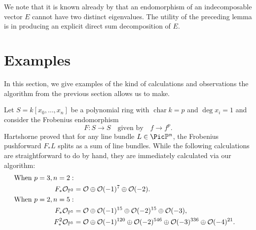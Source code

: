\documentclass[12pt]{article}
\def\O{\mathcal O}
\numberwithin{equation}{section}
\theoremstyle{theorem}
\numberwithin{thm}{section}
\theoremstyle{definition}
\begin{document}
\begin{rem}
We note that it is known already by \cite[Proposition~15]{Atiyah57} that an endomorphism of an indecomposable vector $E$ cannot have two distinct eigenvalues. The utility of the preceding lemma is in producing an explicit direct sum decomposition of $E$.
\end{rem}



\section{Examples}

In this section, we give examples of the kind of calculations and observations the algorithm from the previous section allows us to make.

\renewcommand{\char}{\operatorname{char}}

\begin{exa}
  Let $S = k[x_0,\dots,x_n]$ be a polynomial ring with $\char k = p$ and $\deg x_i = 1$ and consider the Frobenius endomorphism
  \[ F\colon S\to S \quad \text{given by} \quad f \to f^p. \]
  Hartshorne \cite{Hartshorne1970} proved that for any line bundle $L\in\Pic\P^n$, the Frobenius pushforward $F_*L$ splits as a sum of line bundles. While the following calculations are straightforward to do by hand, they are immediately calculated via our algorithm:
  \begin{align*}
    \text{When }p=3, n=2: \\
    F_*\O_{\P^2} &= \O \oplus \O(-1)^7 \oplus \O(-2). \\
    \text{When } p=2, n=5: \\
    F_*\O_{\P^5} &= \O \oplus \O(-1)^{15} \oplus \O(-2)^{15} \oplus \O(-3), \\
    F_*^2\O_{\P^5} &= \O \oplus \O(-1)^{120} \oplus \O(-2)^{546} \oplus \O(-3)^{336} \oplus \O(-4)^{21}.
  \end{align*}
\end{exa}
\end{document}
